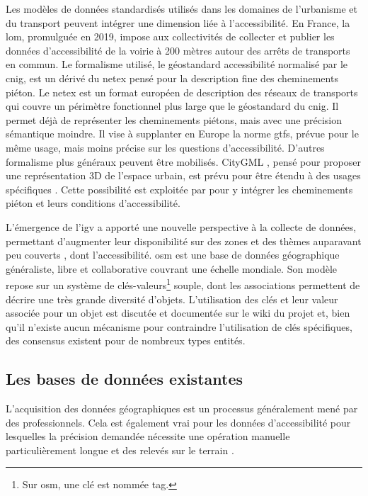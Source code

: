 Les modèles de données standardisés utilisés dans les domaines de l'urbanisme et du transport peuvent intégrer une dimension liée à l'accessibilité. En France, la \gls{lom}, promulguée en 2019, impose aux collectivités de collecter et publier les données d'accessibilité de la voirie à 200 mètres autour des arrêts de transports en commun. Le formalisme utilisé, le géostandard accessibilité normalisé par le \gls{cnig}, est un dérivé du \gls{netex} pensé pour la description fine des cheminements piéton. Le \gls{netex} est un format européen de description des réseaux de transports qui couvre un périmètre fonctionnel plus large que le géostandard du \gls{cnig}. Il permet déjà de représenter les cheminements piétons, mais avec une précision sémantique moindre. Il vise à supplanter en Europe la norme \gls{gtfs}, prévue pour le même usage, mais moins précise sur les questions d'accessibilité. D'autres formalisme plus généraux peuvent être mobilisés. CityGML \cite{Groeger2012}, pensé pour proposer une représentation 3D de l'espace urbain, est prévu pour être étendu à des usages spécifiques \cite{Biljecki2018}. Cette possibilité est exploitée par \cite{Wheeler2020} pour y intégrer les cheminements piéton et leurs conditions d'accessibilité.

L'émergence de l'\gls{igv} a apporté une nouvelle perspective à la collecte de données, permettant d'augmenter leur disponibilité sur des zones et des thèmes auparavant peu couverts \cite{Goodchild2007}, dont l'accessibilité. \gls{osm} est une base de données géographique généraliste, libre et collaborative couvrant une échelle mondiale. Son modèle repose sur un système de clés-valeurs\footnote{Sur \gls{osm}, une clé est nommée tag.} souple, dont les associations permettent de décrire une très grande diversité d'objets. L'utilisation des clés et leur valeur associée pour un objet est discutée et documentée sur le wiki du projet et, bien qu'il n'existe aucun mécanisme pour contraindre l'utilisation de clés spécifiques, des consensus existent pour de nombreux types entités.

\subsection{Les bases de données existantes}

L'acquisition des données géographiques est un processus généralement mené par des professionnels. Cela est également vrai pour les données d'accessibilité pour lesquelles la précision demandée nécessite une opération manuelle particulièrement longue et des relevés sur le terrain \cite{Beale2006}. %

